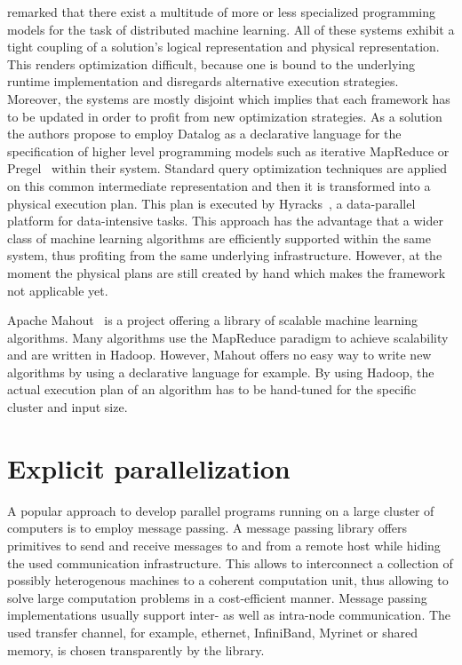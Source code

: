 \Textcite{bu:apa2012a} remarked that there exist a multitude of more or less specialized programming models for the task of distributed machine learning.
All of these systems exhibit a tight coupling of a solution's logical representation and physical representation.
This renders optimization difficult, because one is bound to the underlying runtime implementation and disregards alternative execution strategies.
Moreover, the systems are mostly disjoint which implies that each framework has to be updated in order to profit from new optimization strategies.
As a solution the authors propose to employ Datalog as a declarative language for the specification of higher level programming models such as iterative MapReduce or Pregel~\cite{malewicz:2010a} within their system.
Standard query optimization techniques are applied on this common intermediate representation and then it is transformed into a physical execution plan.
This plan is executed by Hyracks~\cite{borkar:2011a}, a data-parallel platform for data-intensive tasks.
This approach has the advantage that a wider class of machine learning algorithms are efficiently supported within the same system, thus profiting from the same underlying infrastructure.
However, at the moment the physical plans are still created by hand which makes the framework not applicable yet.

Apache Mahout~\cite{mahout:2011a} is a project offering a library of scalable machine learning algorithms.
Many algorithms use the MapReduce paradigm to achieve scalability and are written in Hadoop.
However, Mahout offers no easy way to write new algorithms by using a declarative language for example.
By using Hadoop, the actual execution plan of an algorithm has to be hand-tuned for the specific cluster and input size.

\section{Explicit parallelization}

A popular approach to develop parallel programs running on a large cluster of computers is to employ message passing.
A message passing library offers primitives to send and receive messages to and from a remote host while hiding the used communication infrastructure.
This allows to interconnect a collection of possibly heterogenous machines to a coherent computation unit, thus allowing to solve large computation problems in a cost-efficient manner.
Message passing implementations usually support inter- as well as intra-node communication.
The used transfer channel, for example, ethernet, InfiniBand, Myrinet or shared memory, is chosen transparently by the library.


